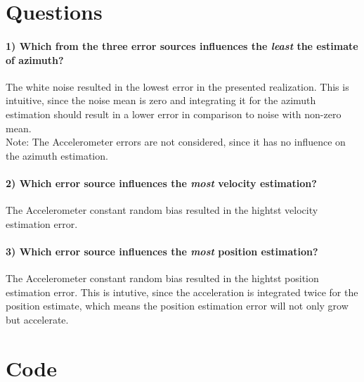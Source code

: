 \documentclass{article}
\begin{document}
\section*{Questions}

\paragraph{1) Which from the three error sources influences the \textit{least} the estimate of azimuth?}
The white noise resulted in the lowest error in the presented realization.
This is intuitive, since the noise mean is zero and integrating it for the azimuth
estimation should result in a lower error in comparison to noise with non-zero mean.
\\
Note: The Accelerometer errors are not considered, since it has no influence on the azimuth estimation.

\paragraph{2) Which error source influences the \textit{most} velocity estimation?}
The Accelerometer constant random bias resulted in the hightst velocity estimation error.

\paragraph{3) Which error source influences the \textit{most} position estimation?}
The Accelerometer constant random bias resulted in the hightst position estimation error.
This is intutive, since the acceleration is integrated twice for the position estimate, which means the position estimation error will not only grow but accelerate.

\section*{Code}

\end{document}

